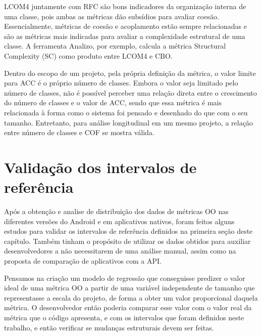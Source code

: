 LCOM4 juntamente com RFC são bons indicadores da organização interna de uma classe, pois ambas as métricas dão subsídios para avaliar coesão. Essencialmente, métricas de coesão e acoplamento estão sempre relacionadas e são as métricas mais indicadas para avaliar a complexidade estrutural de uma classe. A ferramenta Analizo, por exemplo, calcula a métrica Structural Complexity (SC) como produto entre LCOM4 e CBO.


Dentro do escopo de um projeto, pela própria definição da métrica, o valor limite para ACC é o próprio número de classes. Embora o valor seja limitado pelo número de classes, não é possível perceber uma relação direta entre o crescimento do número de classes e o valor de ACC, sendo que essa métrica é mais relacionada à forma como o sistema foi pensado e desenhado do que com o seu tamanho. Entretanto, para análise longitudinal em um mesmo projeto, a relação entre número de classes e COF se mostra válida.

\section{Validação dos intervalos de referência}

Após a obtenção e analise de distribuição dos dados de métricas OO nas diferentes versões do Android e em aplicativos nativos, foram feitos alguns estudos para validar os intervalos de referência definidos na primeira seção deste capítulo. Também tinham o propósito de utilizar os dados obtidos para auxiliar desenvolvedores a não necessitarem de uma análise manual, assim como na proposta de comparação de aplicativos com a API.

Pensamos na criação um modelo de regressão que conseguisse predizer o valor ideal de uma métrica OO a partir de uma variável independente de tamanho que representasse a escala do projeto, de forma a obter um valor proporcional daquela métrica. O desenvolvedor então poderia comparar esse valor com o valor real da métrica que o código apresenta, e com os intervalos que foram definidos neste trabalho, e então verificar se mudanças estruturais devem ser feitas.

